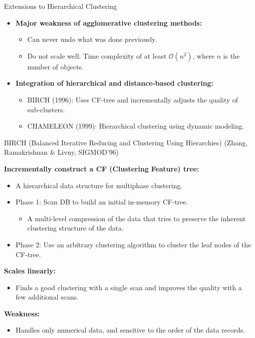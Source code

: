 \begin{frame}{Extensions to Hierarchical Clustering}
  \begin{itemize}
  \item \textbf{Major weakness of agglomerative clustering methods:}
    \begin{itemize}
    \item Can never undo what was done previously.
    \item Do not scale well: Time complexity of at least
      $\mathcal{O}(n^2)$, where $n$ is the number of objects.
    \end{itemize}
  \item \textbf{Integration of hierarchical and distance-based
      clustering:}
    \begin{itemize}
    \item BIRCH (1996): Uses CF-tree and incrementally adjusts the
      quality of sub-clusters.
    \item CHAMELEON (1999): Hierarchical clustering using dynamic
      modeling.
    \end{itemize}
  \end{itemize}
\end{frame}

\begin{frame}{BIRCH (Balanced Iterative Reducing and Clustering Using
    Hierarchies)}
  (Zhang, Ramakrishnan \& Livny, SIGMOD'96)

  \textbf{Incrementally construct a CF (Clustering Feature) tree:}
  \begin{itemize}
  \item A hierarchical data structure for multiphase clustering.
  \item Phase 1: Scan DB to build an initial in-memory CF-tree.
    \begin{itemize}
    \item A multi-level compression of the data that tries to
      preserve the inherent clustering structure of the data.
    \end{itemize}
  \item Phase 2: Use an arbitrary clustering algorithm to cluster the
    leaf nodes of the CF-tree.
  \end{itemize}
  \textbf{Scales linearly:}
  \begin{itemize}
  \item Finds a good clustering with a single scan and improves the
    quality with a few additional scans.
  \end{itemize}
  \textbf{Weakness:}
  \begin{itemize}
  \item Handles only numerical data, and sensitive to the order of
    the data records.
  \end{itemize}
\end{frame}

